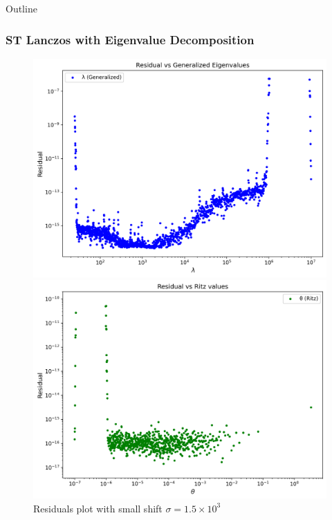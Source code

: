 \documentclass[landscape]{beamer}
\begin{document}
\begin{frame}[allowframebreaks]{Outline}
	\frametitle{ST Lanczos with Eigenvalue Decomposition}
	
\begin{figure}
	\caption{Residuals plot with small shift $\sigma=1.5 \times 10^3$}
	\vspace{1ex}
	\begin{minipage}{0.45\textwidth} %
		\centering
		\includegraphics[scale=.25]{./Plots/eigdecomp/residual_eig_gs.png}
		\subcaption{}
	\end{minipage}%
	\hfill
	\begin{minipage}{0.45\textwidth}
		\centering
		\includegraphics[scale=.25]{./Plots/eigdecomp/residual_eig_rs.png}
		\subcaption{}
	\end{minipage}
	

\end{figure}
\end{frame}
\end{document}
